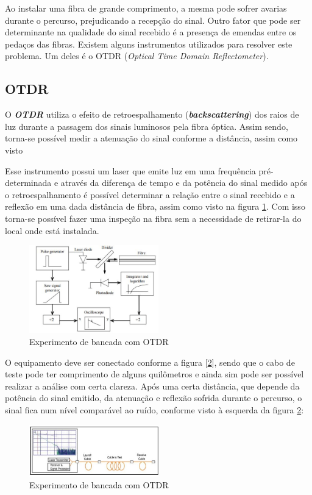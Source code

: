 \documentclass[article]{IEEEtran}
\begin{document}
Ao instalar uma fibra de grande comprimento, a mesma pode sofrer avarias durante o percurso, prejudicando a recepção do sinal. Outro fator que pode ser determinante na qualidade do sinal recebido é a presença de emendas entre os pedaços das fibras. Existem alguns instrumentos utilizados para resolver este problema. Um deles é o OTDR (\textit{Optical Time Domain Reflectometer}).


\subsection{OTDR}
O \textbf{\textit{OTDR}} utiliza o efeito de retroespalhamento (\textbf{\textit{backscattering}}) dos raios de luz durante a passagem dos sinais luminosos pela fibra óptica. Assim sendo, torna-se possível medir a atenuação do sinal conforme a distância, assim como visto \cite{FOA}

Esse instrumento possui um laser que emite luz em uma frequência pré-determinada e através da diferença de tempo e da potência do sinal medido após o retroespalhamento é possível determinar a relação entre o sinal recebido e a reflexão em uma dada distância de fibra, assim como visto na figura \ref{fig:otdr_esquematico}. Com isso torna-se possível fazer uma inspeção na fibra sem a necessidade de retirar-la do local onde está instalada.

\begin{figure}[H]
	\includegraphics[width=0.5\textwidth]{images/OTDR_esquematico.JPG}
	\caption{Experimento de bancada com OTDR}
	\label{fig:otdr_esquematico}
\end{figure}

O equipamento deve ser conectado conforme a figura [\ref{fig:otdr_teste}], sendo que o cabo de teste pode ter comprimento de alguns quilômetros e ainda sim  pode ser possível realizar a análise com certa clareza. Após uma certa distância, que depende da potência do sinal emitido, da atenuação e reflexão sofrida durante o percurso, o sinal fica num nível comparável ao ruído, conforme visto à esquerda da figura \ref{fig:otdr_teste}:
\begin{figure}[H]
	\includegraphics[width=0.5\textwidth]{images/OTDR_teste.JPG}
	\caption{Experimento de bancada com OTDR}
	\label{fig:otdr_teste}
\end{figure}
\end{document}
